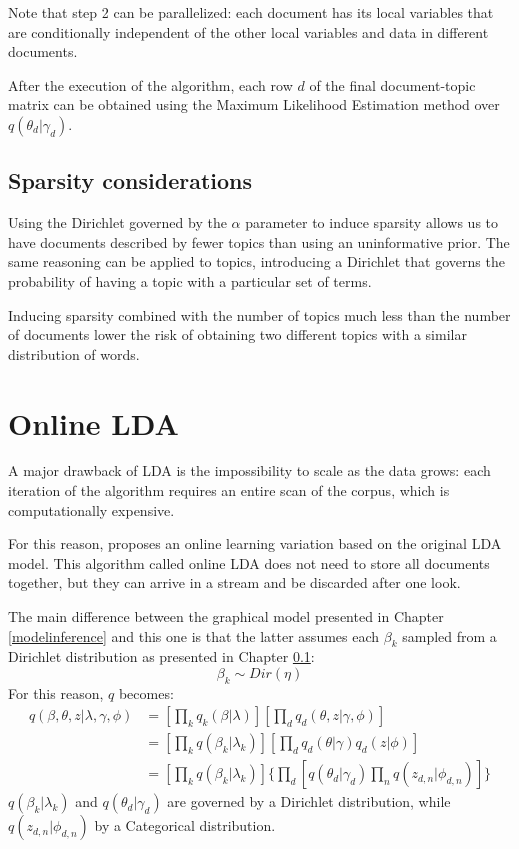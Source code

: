Note that step 2 can be parallelized: each document has its local variables that are conditionally independent
of the other local variables and data in different documents.

After the execution of the algorithm, each row $d$ of the final document-topic matrix can be obtained using the Maximum Likelihood Estimation method over $q(\theta_d | \gamma_d)$.

\subsection{Sparsity considerations} \label{sparsity_lda}
Using the Dirichlet governed by the $\alpha$ parameter to induce sparsity
allows us to have documents described by fewer topics than using an uninformative prior.
The same reasoning can be applied to topics, introducing a Dirichlet that governs the
probability of having a topic with a particular set of terms.

Inducing sparsity combined with the number of topics much less than the number of documents
lower the risk of obtaining two different topics with a similar distribution of words.


\section{Online LDA}
A major drawback of LDA is the impossibility to scale as the data grows:
each iteration of the algorithm requires an entire scan of the corpus, which is computationally expensive.

For this reason, \cite{NIPS2010_3902} proposes an online learning variation based on the original LDA model.
This algorithm called online LDA does not need to store all documents together,
but they can arrive in a stream and be discarded after one look.

The main difference between the graphical model presented in Chapter \ref{modelinference} and this one
is that the latter assumes each $\beta_k$ sampled from a Dirichlet distribution as presented in Chapter \ref{sparsity_lda}:
\begin{equation}
    \beta_k \sim Dir(\eta)
\end{equation}
For this reason, $q$ becomes:
\begin{equation*}
    \begin{split}
        q(\beta, \theta, z| \lambda, \gamma, \phi) & = [\prod_k q_k(\beta | \lambda)] [\prod_d q_d(\theta, z | \gamma, \phi)] \\
        & = [\prod_k q(\beta_k | \lambda_k)] [\prod_d q_d(\theta | \gamma) q_d(z | \phi)] \\
        & = [\prod_k q(\beta_k | \lambda_k)] \{\prod_d [q(\theta_d | \gamma_d) \prod_n q(z_{d,n} | \phi_{d,n})]\}
    \end{split}
\end{equation*}
$q(\beta_k | \lambda_k)$ and $q(\theta_d | \gamma_d)$ are governed by a Dirichlet distribution, while $q(z_{d,n} | \phi_{d,n})$ by a Categorical distribution.

